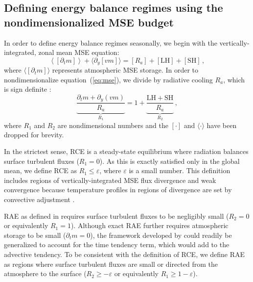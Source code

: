 \documentclass{ametsocV5}
\begin{document}
    \subsection{Defining energy balance regimes using the nondimensionalized MSE budget} \label{subsec:mse}
    In order to define energy balance regimes seasonally, we begin with the vertically-integrated, zonal mean MSE equation:
    \begin{equation} \label{eq:mse}
        \left\langle\left[\partial_t m\right]\right\rangle + \langle\partial_y [vm]\rangle = [R_{a}] + \mathrm{[LH]+[SH]} \, ,
    \end{equation}
    where $\langle[\partial_t m]\rangle$ represents atmospheric MSE storage. In order to nondimensionalize equation~(\ref{eq:mse}), we divide by radiative cooling $R_a$, which is sign definite :
    \begin{equation}
        {\underbrace{\frac{\partial_t m + \partial_y (vm)}{R_{a}}}_{R_1}} = 1 + {\underbrace{\frac{\mathrm{LH+SH}}{R_{a}}}_{R_2}} \, ,
    \end{equation}
    where $R_1$ and $R_2$ are nondimensional numbers and the $[\cdot]$ and $\langle\cdot\rangle$ have been dropped for brevity. 

    In the strictest sense, RCE is a steady-state equilibrium where radiation balances surface turbulent fluxes (\(R_{1}=0\)). As this is exactly satisfied only in the global mean, we define RCE as \(R_{1}\le \varepsilon\), where $\varepsilon$ is a small number. This definition includes regions of vertically-integrated MSE flux divergence and weak convergence because temperature profiles in regions of divergence are set by convective adjustment \citep{warren2020}.

    RAE as defined in \cite{cronin2016} requires surface turbulent fluxes to be negligibly small (\(R_{2}=0\) or equivalently \(R_{1}=1\)). Although exact RAE further requires atmospheric storage to be small ($\partial_t m=0$), the framework developed by \cite{cronin2016} could readily be generalized to account for the time tendency term, which would add to the advective tendency. To be consistent with the definition of RCE, we define RAE as regions where surface turbulent fluxes are small or directed from the atmosphere to the surface (\(R_{2} \ge -\varepsilon \) or equivalently \(R_{1} \ge 1-\varepsilon\)).
\end{document}
